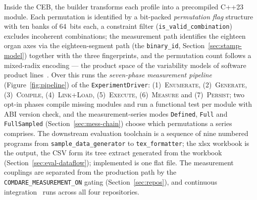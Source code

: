 \begin{nurkurz}
Inside the CEB, the builder transforms each profile into a precompiled C++23 module. Each permutation
is identified by a bit-packed \emph{permutation flag} structure with ten banks of 64~bits each, a
constraint filter (\texttt{is\_valid\_combination}) excludes incoherent combinations; the measurement
path identifies the eighteen organ axes via the eighteen-segment path (the \texttt{binary\_id},
Section~\ref{sec:stamp-model}) together with the three fingerprints, and the permutation count follows
a mixed-radix encoding --- the product space of the variability models of software product
lines~\cite{pohl2005spl}. Over this runs the \emph{seven-phase measurement pipeline}
(Figure~\ref{fig:pipeline}) of the \texttt{ExperimentDriver}: (1)~\textsc{Enumerate},
(2)~\textsc{Generate}, (3)~\textsc{Compile}, (4)~\textsc{Link+Load}, (5)~\textsc{Execute},
(6)~\textsc{Measure} and (7)~\textsc{Persist}; two opt-in phases compile missing modules and run a
functional test per module with ABI version check, and the measurement-series modes \texttt{Defined},
\texttt{Full} and \texttt{FullSampled} (Section~\ref{sec:mess-chain}) choose which permutations a
series comprises. The downstream evaluation toolchain is a sequence of nine numbered programs from
\texttt{sample\_data\_generator} to \texttt{tex\_formatter}; the xlsx workbook is the output, the CSV
form its tree extract generated from the workbook (Section~\ref{sec:eval-dataflow}); implemented is one
flat file. The measurement couplings are separated from the production path by the
\texttt{COMDARE\_\allowbreak{}MEASUREMENT\_\allowbreak{}ON} gating (Section~\ref{sec:repos}), and
continuous integration~\cite{fowler2006ci} runs across all four repositories.
\begin{figure}[htbp]\centering
\end{figure}
\end{nurkurz}
